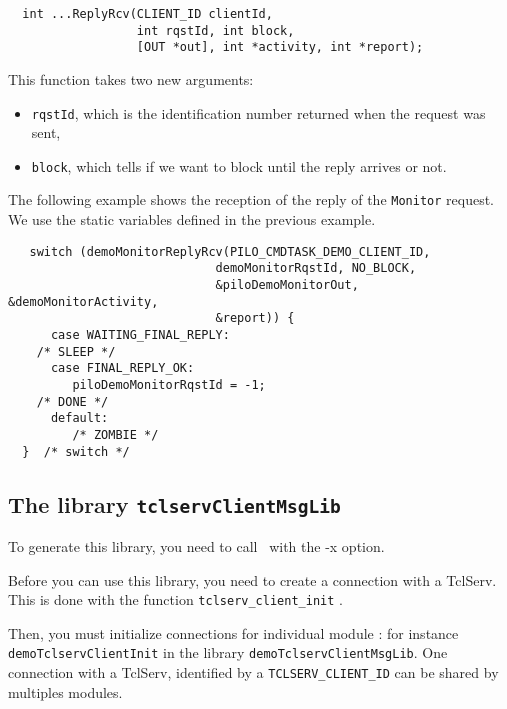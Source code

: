\begin{center}\begin{cartouche}\small\begin{verbatim}
  int ...ReplyRcv(CLIENT_ID clientId,
                  int rqstId, int block,
                  [OUT *out], int *activity, int *report);
\end{verbatim}\end{cartouche}\end{center}

This function takes two new arguments:
\begin{itemize}
\item \texttt{rqstId}, which is the identification number returned when the
request was sent,

\item \texttt{block}, which tells if we want to block until the
reply arrives or not.
\end{itemize}

The  following  example shows the  reception   of the  reply of  the 
\texttt{Monitor}  request.  We   use the static
variables defined in the previous example.


\begin{center}\begin{cartouche}\small\begin{verbatim}
   switch (demoMonitorReplyRcv(PILO_CMDTASK_DEMO_CLIENT_ID, 
                             demoMonitorRqstId, NO_BLOCK,
                             &piloDemoMonitorOut, &demoMonitorActivity, 
                             &report)) {
      case WAITING_FINAL_REPLY:
	/* SLEEP */
      case FINAL_REPLY_OK:
         piloDemoMonitorRqstId = -1;
	/* DONE */
      default:
         /* ZOMBIE */
  }  /* switch */
\end{verbatim}\end{cartouche}\end{center}


\subsection{The library \texttt{tclservClientMsgLib}}
\label{sec|tclserv_client_lib}

To generate this library, you need to call \GenoM\ with the -x option.

Before you can use this library, you need to create a connection with a
TclServ.  This is  done with the  function \texttt{tclserv\_client\_init} .

Then, you  must  initialize   connections  for individual   module : for
instance \texttt{demoTclservClientInit} in the library
\texttt{demoTclservClientMsgLib}. One connection with a TclServ, identified by
a \texttt{TCLSERV\_CLIENT\_ID} can be shared by multiples modules.

